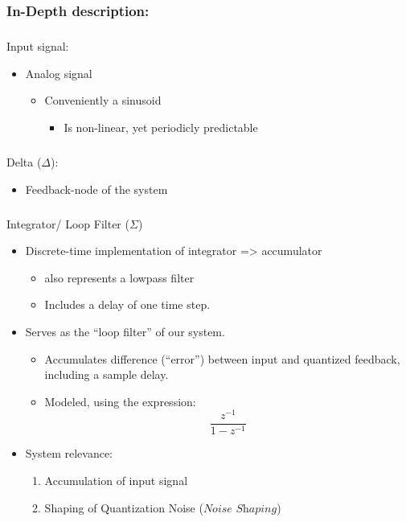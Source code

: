 \documentclass[
  letterpaper,
  DIV=11,
  numbers=noendperiod]{scrartcl}
\makeatletter
\let\oldsubparagraph\subparagraph
\renewcommand{\subparagraph}{
    \@ifstar
      \xxxSubParagraphStar
      \xxxSubParagraphNoStar
  }
\newcommand{\xxxSubParagraphStar}[1]{\oldsubparagraph*{#1}\mbox{}}
\newcommand{\xxxSubParagraphNoStar}[1]{\oldsubparagraph{#1}\mbox{}}
\providecommand{\tightlist}{%
  \setlength{\itemsep}{0pt}\setlength{\parskip}{0pt}}\usepackage{longtable,booktabs,array}
\makeatother
\begin{document}
\subsubsection{In-Depth description:}\label{in-depth-description}

\subparagraph{Input signal:}\label{input-signal}

\begin{itemize}
\tightlist
\item
  Analog signal

  \begin{itemize}
  \tightlist
  \item
    Conveniently a sinusoid

    \begin{itemize}
    \tightlist
    \item
      Is non-linear, yet periodicly predictable
    \end{itemize}
  \end{itemize}
\end{itemize}

\subparagraph{\texorpdfstring{Delta
(\(\Delta\)):}{Delta (\textbackslash Delta):}}\label{delta-delta}

\begin{itemize}
\tightlist
\item
  Feedback-node of the system
\end{itemize}

\subparagraph{\texorpdfstring{Integrator/ Loop Filter
(\(\Sigma\))}{Integrator/ Loop Filter (\textbackslash Sigma)}}\label{integrator-loop-filter-sigma}

\begin{itemize}
\tightlist
\item
  Discrete-time implementation of integrator =\textgreater{} accumulator

  \begin{itemize}
  \tightlist
  \item
    also represents a lowpass filter
  \item
    Includes a delay of one time step.
  \end{itemize}
\item
  Serves as the ``loop filter'' of our system.

  \begin{itemize}
  \tightlist
  \item
    Accumulates difference (``error'') between input and quantized
    feedback, including a sample delay.
  \item
    Modeled, using the expression: \[
    \frac{z^{-1}}{1-z^{-1}}
    \]
  \end{itemize}
\item
  System relevance:

  \begin{enumerate}
  \def\labelenumi{\arabic{enumi}.}
  \tightlist
  \item
    Accumulation of input signal
  \item
    Shaping of Quantization Noise (\(\textit{Noise Shaping}\))
  \end{enumerate}
\end{itemize}
\end{document}
